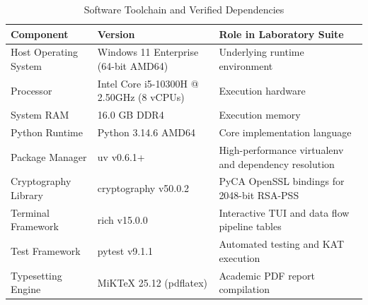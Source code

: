 \documentclass[12pt,a4paper]{report}
\renewcommand{\texttt}[1]{{\normalfont #1}}
\begin{document}
\begin{table}[h!]
\centering
\fontsize{9}{11.5}\selectfont
\renewcommand{\arraystretch}{0.92}
\begin{tabularx}{\linewidth}{|l|l|X|}
\hline
\rowcolor{tableheader}
\textbf{Component} & \textbf{Version} & \textbf{Role in Laboratory Suite} \\
\hline
Host Operating System & Windows 11 Enterprise (64-bit AMD64) & Underlying runtime environment \\
\hline
Processor & Intel Core i5-10300H @ 2.50GHz (8 vCPUs) & Execution hardware \\
\hline
System RAM & 16.0 GB DDR4 & Execution memory \\
\hline
Python Runtime & Python 3.14.6 AMD64 & Core implementation language \\
\hline
Package Manager & \texttt{uv} v0.6.1+ & High-performance virtualenv and dependency resolution \\
\hline
Cryptography Library & \texttt{cryptography} v50.0.2 & PyCA OpenSSL bindings for 2048-bit RSA-PSS \\
\hline
Terminal Framework & \texttt{rich} v15.0.0 & Interactive TUI and data flow pipeline tables \\
\hline
Test Framework & \texttt{pytest} v9.1.1 & Automated testing and KAT execution \\
\hline
Typesetting Engine & MiKTeX 25.12 (\texttt{pdflatex}) & Academic PDF report compilation \\
\hline
\end{tabularx}
\caption{Software Toolchain and Verified Dependencies}
\label{tab:sysreq}
\end{table}
\end{document}
